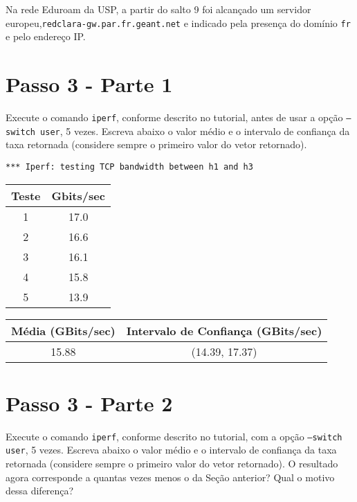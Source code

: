 \documentclass[12pt,letterpaper]{article}
\begin{document}
Na rede Eduroam da USP, a partir do salto 9 foi alcançado um servidor europeu,\newline \texttt{redclara-gw.par.fr.geant.net}
e indicado pela presença do domínio \texttt{fr} e pelo endereço IP.

\section{Passo 3 - Parte 1}


Execute o comando \texttt{iperf}, conforme descrito no
tutorial, antes de usar a opção \texttt{--switch user}, 5 vezes.
Escreva abaixo o valor médio e o intervalo de confiança da taxa
retornada (considere sempre o primeiro valor do vetor retornado).

\begin{verbatim}
*** Iperf: testing TCP bandwidth between h1 and h3
\end{verbatim}

\begin{center}
\begin{tabular}{ |c|c| } 
 \hline
 Teste & Gbits/sec \\
 \hline
 1 & 17.0 \\ 
 2 & 16.6 \\ 
 3 & 16.1 \\ 
 4 & 15.8 \\ 
 5 & 13.9 \\ 
 \hline
\end{tabular}
\end{center}

\begin{center}
\begin{tabular}{|c|c|}
 \hline
 Média (GBits/sec) & Intervalo de Confiança (GBits/sec)\\
 \hline
 15.88 & (14.39, 17.37) \\
 \hline
 \end{tabular}
\end{center}

\section{Passo 3 - Parte 2}


Execute o comando \texttt{iperf}, conforme descrito no
tutorial, com a opção \texttt{--switch user}, 5 vezes. Escreva abaixo
o valor médio e o intervalo de confiança da taxa retornada (considere
sempre o primeiro valor do vetor retornado). O resultado agora
corresponde a quantas vezes menos o da Seção anterior? Qual o motivo
dessa diferença?
\end{document}
